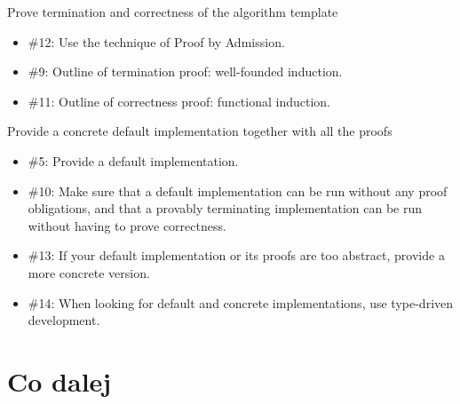 \documentclass{beamer}
\begin{document}
\begin{frame}{Prove termination and correctness of the algorithm template}
\begin{itemize}
	\item \#12: Use the technique of Proof by Admission.
	\item \#9: Outline of termination proof: well-founded induction.
	\item \#11: Outline of correctness proof: functional induction.
\end{itemize}
\end{frame}


\begin{frame}{Provide a concrete default implementation together with all the proofs}
\begin{itemize}
	\item \#5: Provide a default implementation.
	\item \#10: Make sure that a default implementation can be run without any proof obligations, and that a provably terminating implementation can be run without having to prove correctness.
	\item \#13: If your default implementation or its proofs are too abstract, provide a more concrete version.
	\item \#14: When looking for default and concrete implementations, use type-driven development.
\end{itemize}
\end{frame}

\section{Co dalej}
\end{document}
